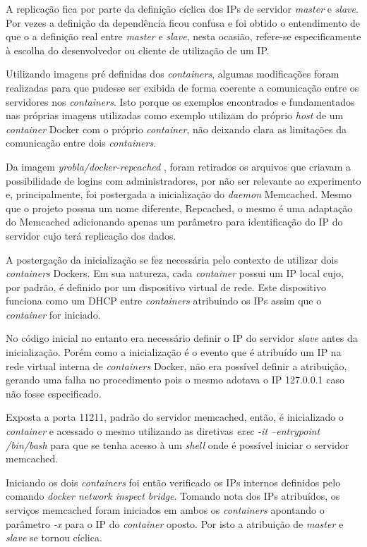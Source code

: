 \documentclass[conference]{IEEEtran}
\begin{document}
A replicação fica por parte da definição cíclica dos IPs de servidor \textit{master} e \textit{slave}. Por vezes a definição da dependência ficou confusa e foi obtido o entendimento de que o a definição real entre \textit{master} e \textit{slave}, nesta ocasião, refere-se especificamente à escolha do desenvolvedor ou cliente de utilização de um IP.

Utilizando imagens pré definidas dos \textit{containers}, algumas modificações foram realizadas para que pudesse ser exibida de forma coerente a comunicação entre os servidores nos \textit{containers}. Isto porque os exemplos encontrados e fundamentados nas próprias imagens utilizadas como exemplo utilizam do próprio \textit{host} de um \textit{container} Docker com o próprio \textit{container}, não deixando clara as limitações da comunicação entre dois \textit{containers}.

Da imagem \textit{yrobla/docker-repcached} \cite{yrobla}, foram retirados os arquivos que criavam a possibilidade de logins com administradores, por não ser relevante ao experimento e, principalmente, foi postergada a inicialização do \textit{daemon} Memcached. Mesmo que o projeto possua um nome diferente, Repcached, o mesmo é uma adaptação do Memcached adicionando apenas um parâmetro para identificação do IP do servidor cujo terá replicação dos dados.

A postergação da inicialização se fez necessária pelo contexto de utilizar dois \textit{containers} Dockers. Em sua natureza, cada \textit{container} possui um IP local cujo, por padrão, é definido por um dispositivo virtual de rede. Este dispositivo funciona como um DHCP entre \textit{containers} atribuindo os IPs assim que o \textit{container} for iniciado.

No código inicial no entanto era necessário definir o IP do servidor \textit{slave} antes da inicialização. Porém como a inicialização é o evento que é atribuído um IP na rede virtual interna de \textit{containers} Docker, não era possível definir a atribuição, gerando uma falha no procedimento pois o mesmo adotava o IP 127.0.0.1 caso não fosse especificado.

Exposta a porta 11211, padrão do servidor memcached, então, é inicializado o \textit{container} e acessado o mesmo utilizando as diretivas \textit{exec -it --entrypoint /bin/bash} para que se tenha acesso à um \textit{shell} onde é possível iniciar o servidor memcached. 

Iniciando os dois \textit{containers} foi então verificado os IPs internos definidos pelo comando \textit{docker network inspect bridge}. Tomando nota dos IPs atribuídos, os serviços memcached foram iniciados em ambos os \textit{containers} apontando o parâmetro \textit{-x} para o IP do \textit{container} oposto. Por isto a atribuição de \textit{master} e \textit{slave} se tornou cíclica.
\end{document}
